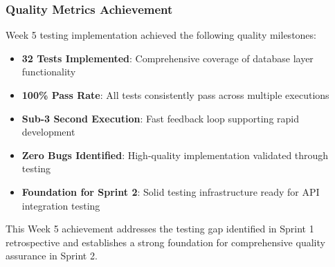 \documentclass[12pt]{article}
\begin{document}
\subsubsection{Quality Metrics Achievement}
Week 5 testing implementation achieved the following quality milestones:

\begin{itemize}
  \item \textbf{32 Tests Implemented}: Comprehensive coverage of database layer functionality
  \item \textbf{100\% Pass Rate}: All tests consistently pass across multiple executions
  \item \textbf{Sub-3 Second Execution}: Fast feedback loop supporting rapid development
  \item \textbf{Zero Bugs Identified}: High-quality implementation validated through testing
  \item \textbf{Foundation for Sprint 2}: Solid testing infrastructure ready for API integration testing
\end{itemize}

This Week 5 achievement addresses the testing gap identified in Sprint 1 retrospective and establishes a strong foundation for comprehensive quality assurance in Sprint 2.
\end{document}
